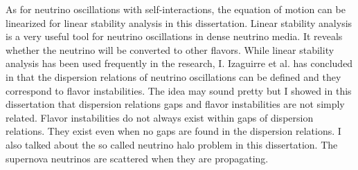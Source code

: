 As for neutrino oscillations with self-interactions, the equation of motion can be linearized for linear stability analysis in this dissertation. Linear stability analysis is a very useful tool for neutrino oscillations in dense neutrino media. It reveals whether the neutrino will be converted to other flavors. While linear stability analysis has been used frequently in the research, I. Izaguirre et al. has concluded in \cite{Izaguirre2016a} that the dispersion relations of neutrino oscillations can be defined and they correspond to flavor instabilities. The idea may sound pretty but I showed in this dissertation that dispersion relations gaps and flavor instabilities are not simply related. Flavor instabilities do not always exist within gaps of dispersion relations. They exist even when no gaps are found in the dispersion relations. I also talked about the so called neutrino halo problem in this dissertation. The supernova neutrinos are scattered when they are propagating. 
